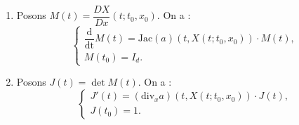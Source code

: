 \documentclass[12pt,a4paper]{article}
\newcommand\deriv[2]{\dfrac{\mathrm{d}#1}{\mathrm{d#2}}}
\begin{document}
	\begin{thm}$ $\\
		\begin{enumerate}
			\item Posons $M(t) = \dfrac{DX}{Dx}(t;t_0,x_0)$. On a :
			\begin{equation}
				\begin{cases}
					\deriv{}t M(t) = \mathrm{Jac}(a)(t,X(t;t_0,x_0)) \cdot M(t),\\
					M(t_0) = I_d.
				\end{cases}
			\end{equation}
			
			\item Posons $J(t) = \det M(t)$. On a :
			\begin{equation}
				\begin{cases}
					J'(t) = \left(\mathrm{div}_x a\right)(t,X(t;t_0,x_0))\cdot J(t),\\
					J(t_0) = 1.
				\end{cases}
			\end{equation}
		\end{enumerate}
	\end{thm}
\end{document}
